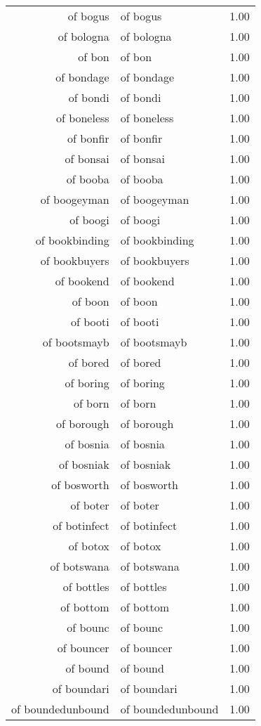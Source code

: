 \begin{table}[ht]
\begin{tabular}{rlr}
  of bogus & of bogus & 1.00 \\ 
  of bologna & of bologna & 1.00 \\ 
  of bon & of bon & 1.00 \\ 
  of bondage & of bondage & 1.00 \\ 
  of bondi & of bondi & 1.00 \\ 
  of boneless & of boneless & 1.00 \\ 
  of bonfir & of bonfir & 1.00 \\ 
  of bonsai & of bonsai & 1.00 \\ 
  of booba & of booba & 1.00 \\ 
  of boogeyman & of boogeyman & 1.00 \\ 
  of boogi & of boogi & 1.00 \\ 
  of bookbinding & of bookbinding & 1.00 \\ 
  of bookbuyers & of bookbuyers & 1.00 \\ 
  of bookend & of bookend & 1.00 \\ 
  of boon & of boon & 1.00 \\ 
  of booti & of booti & 1.00 \\ 
  of bootsmayb & of bootsmayb & 1.00 \\ 
  of bored & of bored & 1.00 \\ 
  of boring & of boring & 1.00 \\ 
  of born & of born & 1.00 \\ 
  of borough & of borough & 1.00 \\ 
  of bosnia & of bosnia & 1.00 \\ 
  of bosniak & of bosniak & 1.00 \\ 
  of bosworth & of bosworth & 1.00 \\ 
  of boter & of boter & 1.00 \\ 
  of botinfect & of botinfect & 1.00 \\ 
  of botox & of botox & 1.00 \\ 
  of botswana & of botswana & 1.00 \\ 
  of bottles & of bottles & 1.00 \\ 
  of bottom & of bottom & 1.00 \\ 
  of bounc & of bounc & 1.00 \\ 
  of bouncer & of bouncer & 1.00 \\ 
  of bound & of bound & 1.00 \\ 
  of boundari & of boundari & 1.00 \\ 
  of boundedunbound & of boundedunbound & 1.00 \\ 

\end{tabular}
\end{table}
